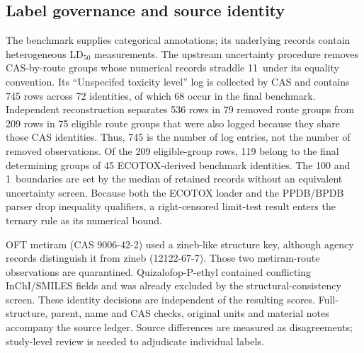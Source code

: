 \documentclass[10pt]{article}
\begin{document}
\subsection*{Label governance and source identity}
The benchmark supplies categorical annotations; its underlying records contain heterogeneous LD\(_{50}\) measurements. The upstream uncertainty procedure removes CAS-by-route groups whose numerical records straddle 11~\ugbee under its equality convention. Its ``Unspecifed toxicity level'' log is collected by CAS and contains 745 rows across 72 identities, of which 68 occur in the final benchmark. Independent reconstruction separates 536 rows in 79 removed route groups from 209 rows in 75 eligible route groups that were also logged because they share those CAS identities. Thus, 745 is the number of log entries, not the number of removed observations. Of the 209 eligible-group rows, 119 belong to the final determining groups of 45 ECOTOX-derived benchmark identities. The 100 and 1~\ugbee boundaries are set by the median of retained records without an equivalent uncertainty screen. Because both the ECOTOX loader and the PPDB/BPDB parser drop inequality qualifiers, a right-censored limit-test result enters the ternary rule as its numerical bound.

OFT metiram (CAS 9006-42-2) used a zineb-like structure key, although agency records distinguish it from zineb (12122-67-7). Those two metiram-route observations are quarantined. Quizalofop-P-ethyl contained conflicting InChI/SMILES fields and was already excluded by the structural-consistency screen. These identity decisions are independent of the resulting scores. Full-structure, parent, name and CAS checks, original units and material notes accompany the source ledger. Source differences are measured as disagreements; study-level review is needed to adjudicate individual labels.
\end{document}
